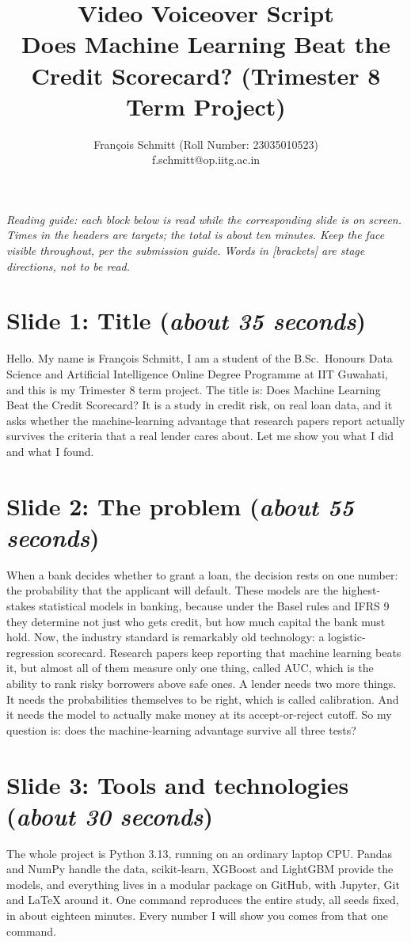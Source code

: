 \documentclass[a4paper,11pt]{article}
\title{\bfseries Video Voiceover Script\\
\large Does Machine Learning Beat the Credit Scorecard? (Trimester 8 Term Project)}
\author{François Schmitt (Roll Number: 23035010523)\\
\ttfamily f.schmitt@op.iitg.ac.in}
\date{}
\newcommand{\slideblock}[3]{%
  \section*{Slide #1: #2 \hfill \normalfont\small(\textit{#3})}}
\begin{document}
\maketitle

\noindent\textit{Reading guide: each block below is read while the corresponding slide is on screen. Times in the headers are targets; the total is about ten minutes. Keep the face visible throughout, per the submission guide. Words in [brackets] are stage directions, not to be read.}

\slideblock{1}{Title}{about 35 seconds}
Hello. My name is François Schmitt, I am a student of the B.Sc.\ Honours Data Science and Artificial Intelligence Online Degree Programme at IIT Guwahati, and this is my Trimester 8 term project. The title is: Does Machine Learning Beat the Credit Scorecard? It is a study in credit risk, on real loan data, and it asks whether the machine-learning advantage that research papers report actually survives the criteria that a real lender cares about. Let me show you what I did and what I found.

\slideblock{2}{The problem}{about 55 seconds}
When a bank decides whether to grant a loan, the decision rests on one number: the probability that the applicant will default. These models are the highest-stakes statistical models in banking, because under the Basel rules and IFRS 9 they determine not just who gets credit, but how much capital the bank must hold. Now, the industry standard is remarkably old technology: a logistic-regression scorecard. Research papers keep reporting that machine learning beats it, but almost all of them measure only one thing, called AUC, which is the ability to rank risky borrowers above safe ones. A lender needs two more things. It needs the probabilities themselves to be right, which is called calibration. And it needs the model to actually make money at its accept-or-reject cutoff. So my question is: does the machine-learning advantage survive all three tests?

\slideblock{3}{Tools and technologies}{about 30 seconds}
The whole project is Python 3.13, running on an ordinary laptop CPU. Pandas and NumPy handle the data, scikit-learn, XGBoost and LightGBM provide the models, and everything lives in a modular package on GitHub, with Jupyter, Git and LaTeX around it. One command reproduces the entire study, all seeds fixed, in about eighteen minutes. Every number I will show you comes from that one command.
\end{document}
